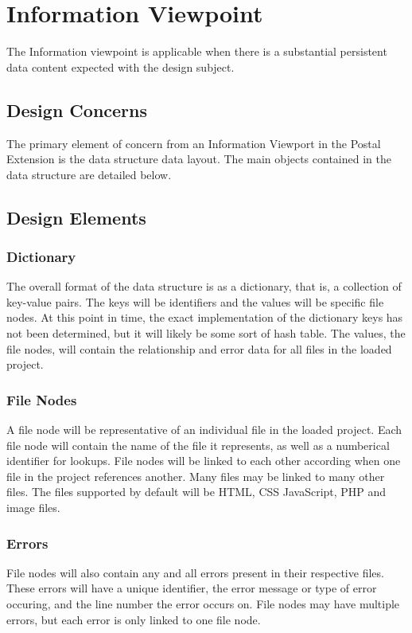 \documentclass[letterpaper,10pt,titlepage,draftclsnofoot,onecolumn,onesided] {IEEEtran}
\begin{document}
	
\section{Information Viewpoint}
The Information viewpoint is applicable when there is a substantial persistent data content expected with
the design subject. 
\subsection{Design Concerns}
The primary element of concern from an Information Viewport in the Postal Extension is the data structure data layout. 
The main objects contained in the data structure are detailed below.
\subsection{Design Elements}

	\subsubsection{Dictionary}
	The overall format of the data structure is as a dictionary, that is, a collection of key-value pairs. 
	The keys will be identifiers and the values will be specific file nodes. 
	At this point in time, the exact implementation of the dictionary keys has not been determined, but it will likely be some sort of hash table.
	The values, the file nodes, will contain the relationship and error data for all files in the loaded project.
	\subsubsection{File Nodes}
		A file node will be representative of an individual file in the loaded project. 
		Each file node will contain the name of the file it represents, as well as a numberical identifier for lookups.
		File nodes will be linked to each other according when one file in the project references another. 
		Many files may be linked to many other files.
		The files supported by default will be HTML, CSS JavaScript, PHP and image files.
		
	\subsubsection{Errors}
		File nodes will also contain any and all errors present in their respective files.
		These errors will have a unique identifier, the error message or type of error occuring, and the line number the error occurs on.
		File nodes may have multiple errors, but each error is only linked to one file node.
\end{document}
